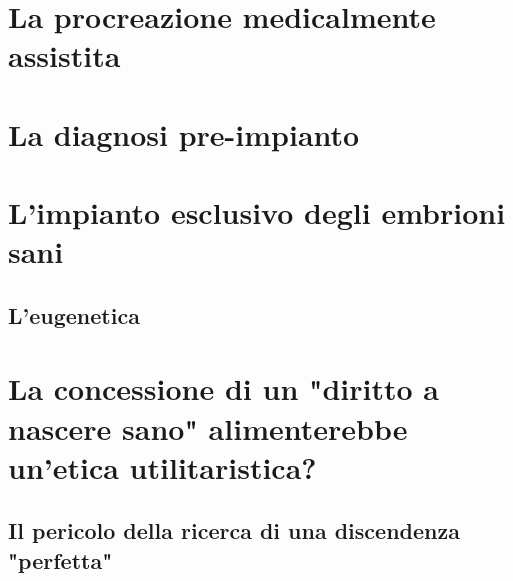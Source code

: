 \section{La procreazione medicalmente assistita}
\section{La diagnosi pre-impianto}
\section{L'impianto esclusivo degli embrioni sani}
\subsection{L'eugenetica}
\section{La concessione di un "diritto a nascere sano" alimenterebbe un'etica utilitaristica?}
\subsection{Il pericolo della ricerca di una discendenza "perfetta"}